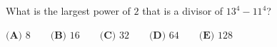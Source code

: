 What is the largest power of $2$ that is a divisor of $13^4-11^4$?

$\textbf{(A) }8\qquad\textbf{(B) }16\qquad\textbf{(C) }32\qquad\textbf{(D) }64\qquad\textbf{(E) }128$
